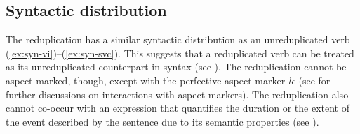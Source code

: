 \subsection{Syntactic distribution}\label{sec:syn-dis}

The reduplication has a similar syntactic distribution as an unreduplicated verb (\ref{ex:syn-vi})--(\ref{ex:syn-svc}). 
This suggests that a reduplicated verb can be treated as its unreduplicated counterpart in syntax (see ).
The reduplication cannot be aspect marked, though, except with the perfective aspect marker \textit{le} (see  for further discussions on interactions with aspect markers). 
The reduplication also cannot co-occur with an expression that quantifies the duration or the extent of the event described by the sentence due to its semantic properties (see ).


